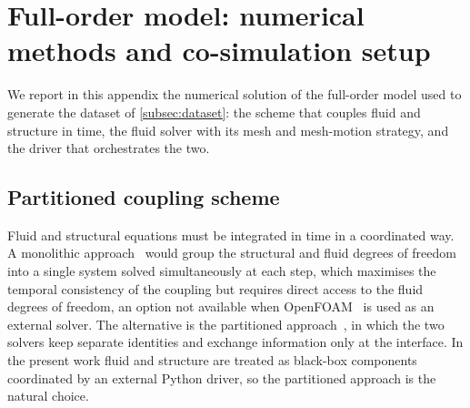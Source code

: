 \section{Full-order model: numerical methods and co-simulation setup}
\label{app:fom}

We report in this appendix the numerical solution of the full-order model  used to generate the dataset of \cref{subsec:dataset}: the scheme that couples fluid and structure in time, the fluid solver with its mesh and mesh-motion strategy, and the driver that orchestrates the two.

\subsection{Partitioned coupling scheme}
\label{subsec:partitioned}
\label{subsec:fsi_formulation}
\label{subsubsec:coupling}

Fluid and structural equations must be integrated in time in a coordinated way. A monolithic approach~\cite{hubner2004monolithic,heil2004solver} would group the structural and fluid degrees of freedom into a single system solved simultaneously at each step, which maximises the temporal consistency of the coupling but requires direct access to the fluid degrees of freedom, an option not available when OpenFOAM~\cite{weller1998openfoam} is used as an external solver. The alternative is the partitioned approach~\cite{felippa2001partitioned,hou2012review}, in which the two solvers keep separate identities and exchange information only at the interface. In the present work fluid and structure are treated as black-box components coordinated by an external Python driver, so the partitioned approach is the natural choice.

